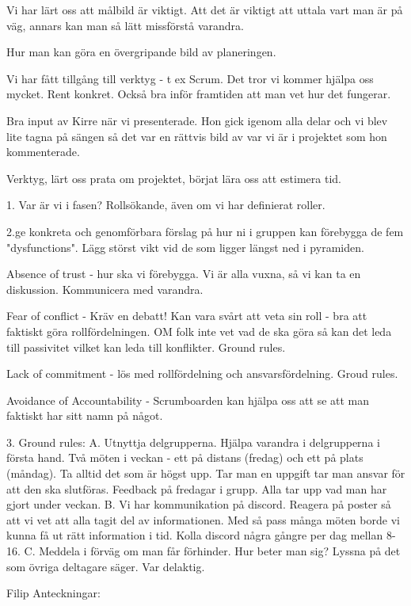 Vi har lärt oss att målbild är viktigt. Att det är viktigt att uttala vart man är på väg, annars kan man så lätt missförstå varandra.                                                               

Hur man kan göra en övergripande bild av planeringen. 

Vi har fått tillgång till verktyg - t ex Scrum. Det tror vi kommer hjälpa oss mycket. Rent konkret. Också bra inför framtiden att man vet hur det fungerar. 

Bra input av Kirre när vi presenterade. Hon gick igenom alla delar och vi blev lite tagna på sängen så det var en rättvis bild av var vi är i projektet som hon kommenterade.

Verktyg, lärt oss prata om projektet, börjat lära oss att estimera tid. 


1. Var är vi i fasen?
Rollsökande, även om vi har definierat roller. 

2.ge konkreta och genomförbara förslag på hur ni i gruppen kan förebygga de fem "dysfunctions". Lägg störst vikt vid de som ligger längst ned i pyramiden.

Absence of trust - hur ska vi förebygga. Vi är alla vuxna, så vi kan ta en diskussion. Kommunicera med varandra. 

Fear of conflict - Kräv en debatt! Kan vara svårt att veta sin roll - bra att faktiskt göra rollfördelningen. OM folk inte vet vad de ska göra så kan det leda till passivitet vilket kan leda till konflikter. Ground rules.

Lack of commitment - lös med rollfördelning och ansvarsfördelning. Groud rules. 

Avoidance of Accountability - Scrumboarden kan hjälpa oss att se att man faktiskt har sitt namn på något.

3. Ground rules: 
	A. Utnyttja delgrupperna. Hjälpa varandra i delgrupperna i första hand. Två möten i veckan - ett på distans (fredag) och ett på plats (måndag). Ta alltid det som är högst upp. Tar man en uppgift tar man ansvar för att den ska slutföras. Feedback på fredagar i grupp. Alla tar upp vad man har gjort under veckan.
 	B. Vi har kommunikation på discord. Reagera på poster så att vi vet att alla tagit del av informationen. Med så pass många möten borde vi kunna få ut rätt information i tid. Kolla discord några gångre per dag mellan 8-16.
	C. Meddela i förväg om man får förhinder. Hur beter man sig? Lyssna på det som övriga deltagare säger. Var delaktig. 
	

Filip Anteckningar:


